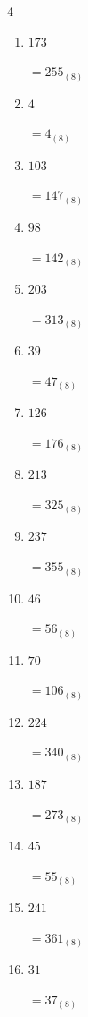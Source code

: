 \begin{multicols}{4}
\begin{enumerate}
        $=33_{(8)}$

  \item $173$

        $=255_{(8)}$

  \item $4$

        $=4_{(8)}$

\columnbreak %

  \item $103$

        $=147_{(8)}$

  \item $98$

        $=142_{(8)}$

  \item $203$

        $=313_{(8)}$

  \item $39$

        $=47_{(8)}$

  \item $126$

        $=176_{(8)}$

  \item $213$

        $=325_{(8)}$

  \item $237$

        $=355_{(8)}$

  \item $46$

        $=56_{(8)}$

  \item $70$

        $=106_{(8)}$

  \item $224$

        $=340_{(8)}$

  \item $187$

        $=273_{(8)}$

  \item $45$

        $=55_{(8)}$

  \item $241$

        $=361_{(8)}$

  \item $31$

        $=37_{(8)}$


\end{enumerate}
\end{multicols}
